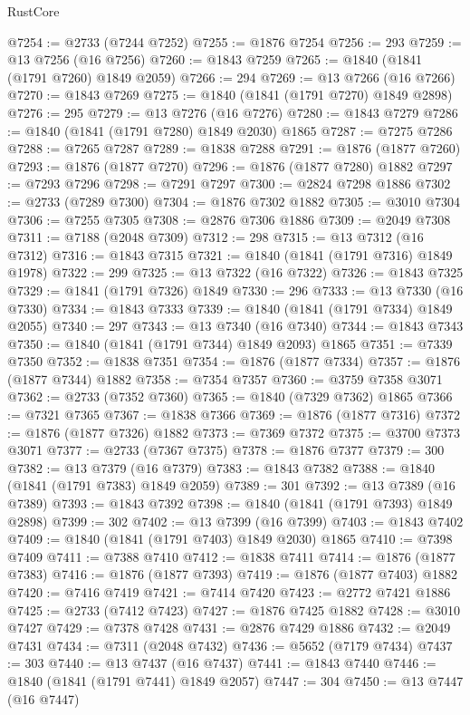 \begin{lexlean}{RustCore}
\begin{coremodule}
@7254 := @2733 (@7244 @7252)
@7255 := @1876 @7254
@7256 := 293
@7259 := @13 @7256 (@16 @7256)
@7260 := @1843 @7259
@7265 := @1840 (@1841 (@1791 @7260) @1849 @2059)
@7266 := 294
@7269 := @13 @7266 (@16 @7266)
@7270 := @1843 @7269
@7275 := @1840 (@1841 (@1791 @7270) @1849 @2898)
@7276 := 295
@7279 := @13 @7276 (@16 @7276)
@7280 := @1843 @7279
@7286 := @1840 (@1841 (@1791 @7280) @1849 @2030) @1865
@7287 := @7275 @7286
@7288 := @7265 @7287
@7289 := @1838 @7288
@7291 := @1876 (@1877 @7260)
@7293 := @1876 (@1877 @7270)
@7296 := @1876 (@1877 @7280) @1882
@7297 := @7293 @7296
@7298 := @7291 @7297
@7300 := @2824 @7298 @1886
@7302 := @2733 (@7289 @7300)
@7304 := @1876 @7302 @1882
@7305 := @3010 @7304
@7306 := @7255 @7305
@7308 := @2876 @7306 @1886
@7309 := @2049 @7308
@7311 := @7188 (@2048 @7309)
@7312 := 298
@7315 := @13 @7312 (@16 @7312)
@7316 := @1843 @7315
@7321 := @1840 (@1841 (@1791 @7316) @1849 @1978)
@7322 := 299
@7325 := @13 @7322 (@16 @7322)
@7326 := @1843 @7325
@7329 := @1841 (@1791 @7326) @1849
@7330 := 296
@7333 := @13 @7330 (@16 @7330)
@7334 := @1843 @7333
@7339 := @1840 (@1841 (@1791 @7334) @1849 @2055)
@7340 := 297
@7343 := @13 @7340 (@16 @7340)
@7344 := @1843 @7343
@7350 := @1840 (@1841 (@1791 @7344) @1849 @2093) @1865
@7351 := @7339 @7350
@7352 := @1838 @7351
@7354 := @1876 (@1877 @7334)
@7357 := @1876 (@1877 @7344) @1882
@7358 := @7354 @7357
@7360 := @3759 @7358 @3071
@7362 := @2733 (@7352 @7360)
@7365 := @1840 (@7329 @7362) @1865
@7366 := @7321 @7365
@7367 := @1838 @7366
@7369 := @1876 (@1877 @7316)
@7372 := @1876 (@1877 @7326) @1882
@7373 := @7369 @7372
@7375 := @3700 @7373 @3071
@7377 := @2733 (@7367 @7375)
@7378 := @1876 @7377
@7379 := 300
@7382 := @13 @7379 (@16 @7379)
@7383 := @1843 @7382
@7388 := @1840 (@1841 (@1791 @7383) @1849 @2059)
@7389 := 301
@7392 := @13 @7389 (@16 @7389)
@7393 := @1843 @7392
@7398 := @1840 (@1841 (@1791 @7393) @1849 @2898)
@7399 := 302
@7402 := @13 @7399 (@16 @7399)
@7403 := @1843 @7402
@7409 := @1840 (@1841 (@1791 @7403) @1849 @2030) @1865
@7410 := @7398 @7409
@7411 := @7388 @7410
@7412 := @1838 @7411
@7414 := @1876 (@1877 @7383)
@7416 := @1876 (@1877 @7393)
@7419 := @1876 (@1877 @7403) @1882
@7420 := @7416 @7419
@7421 := @7414 @7420
@7423 := @2772 @7421 @1886
@7425 := @2733 (@7412 @7423)
@7427 := @1876 @7425 @1882
@7428 := @3010 @7427
@7429 := @7378 @7428
@7431 := @2876 @7429 @1886
@7432 := @2049 @7431
@7434 := @7311 (@2048 @7432)
@7436 := @5652 (@7179 @7434)
@7437 := 303
@7440 := @13 @7437 (@16 @7437)
@7441 := @1843 @7440
@7446 := @1840 (@1841 (@1791 @7441) @1849 @2057)
@7447 := 304
@7450 := @13 @7447 (@16 @7447)

\end{coremodule}
\end{lexlean}
